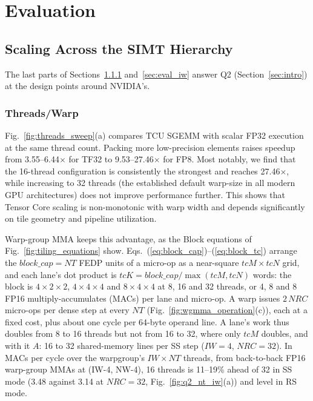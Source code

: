 \section{Evaluation}\label{sec:eval}

\subsection{Scaling Across the SIMT Hierarchy}\label{sec:eval_hierarchy}

The last parts of Sections~\ref{sec:eval_threads} and~\ref{sec:eval_iw} answer Q2 (Section~\ref{sec:intro}) at the design points around NVIDIA's.

\subsubsection{Threads/Warp}\label{sec:eval_threads}
Fig.~\ref{fig:threads_sweep}(a) compares TCU SGEMM with scalar FP32 execution
at the same thread count. Packing more low-precision elements raises
speedup from 3.55--6.44$\times$ for TF32 to 9.53--27.46$\times$ for FP8.
Most notably, we find that the 16-thread configuration is consistently the strongest and reaches
27.46$\times$, while increasing to 32 threads (the established default warp-size in all modern GPU architectures) does not improve performance
further. This shows that Tensor Core scaling is non-monotonic with warp width
and depends significantly on tile geometry and pipeline utilization.

Warp-group MMA keeps this advantage, as the Block equations of Fig.~\ref{fig:tiling_equations} show. Eqs.~(\ref{eq:block_cap})--(\ref{eq:block_tc}) arrange the $\mathit{block\_cap}{=}\mathit{NT}$ FEDP units of a micro-op as a near-square $\mathit{tcM}{\times}\mathit{tcN}$ grid, and each lane's dot product is $\mathit{tcK}{=}\mathit{block\_cap}/\max(\mathit{tcM},\mathit{tcN})$ words: the block is $4{\times}2{\times}2$, $4{\times}4{\times}4$ and $8{\times}4{\times}4$ at 8, 16 and 32 threads, or 4, 8 and 8 FP16 multiply-accumulates (MACs) per lane and micro-op. A warp issues $2\,\mathit{NRC}$ micro-ops per dense step at every $\mathit{NT}$ (Fig.~\ref{fig:wgmma_operation}(c)), each at a fixed cost, plus about one cycle per 64-byte operand line. A lane's work thus doubles from 8 to 16 threads but not from 16 to 32, where only $\mathit{tcM}$ doubles, and with it $A$: 16 to 32 shared-memory lines per SS step ($\mathit{IW}{=}4$, $\mathit{NRC}{=}32$). In MACs per cycle over the warpgroup's $\mathit{IW}{\times}\mathit{NT}$ threads, from back-to-back FP16 warp-group MMAs at (IW-4, NW-4), 16 threads is 11--19\% ahead of 32 in SS mode (3.48 against 3.14 at $\mathit{NRC}{=}32$, Fig.~\ref{fig:q2_nt_iw}(a)) and level in RS mode.

